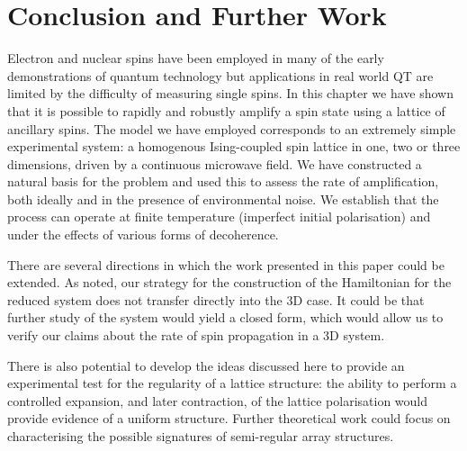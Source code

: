 



\section{Conclusion and Further Work}

Electron and nuclear spins have been employed in many of the early demonstrations of quantum technology but applications in real world QT are limited by the difficulty of measuring single spins. In this chapter we have shown that it is possible to rapidly and robustly amplify a spin state using a lattice of ancillary spins. The model we have employed corresponds to an extremely simple experimental system: a homogenous Ising-coupled spin lattice in one, two or three dimensions, driven by a continuous microwave field. We have constructed a natural basis for the problem and used this to assess the rate of amplification, both ideally and in the presence of environmental noise. We establish that the process can operate at finite temperature (imperfect initial polarisation) and under the effects of various forms of decoherence.

There are several directions in which the work presented in this paper could be extended. As noted, our strategy for the construction of the Hamiltonian for the reduced system does not transfer directly into the 3D case. It could be that further study of the system would yield a closed form, which would allow us to verify our claims about the rate of spin propagation in a 3D system.

There is also potential to develop the ideas discussed here to provide an experimental test for the regularity of a lattice structure: the ability to perform a controlled expansion, and later contraction, of the lattice polarisation would provide evidence of a uniform structure. Further theoretical work could focus on characterising the possible signatures of semi-regular array structures.



